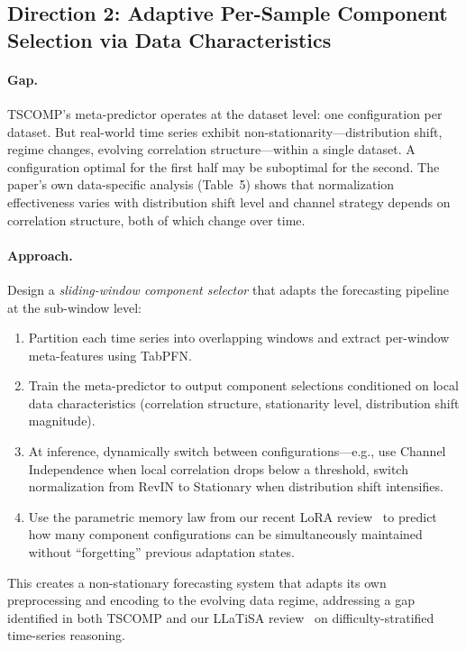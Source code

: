 \documentclass[11pt,a4paper]{article}
\begin{document}
\subsection{Direction 2: Adaptive Per-Sample Component Selection via Data Characteristics}

\paragraph{Gap.} TSCOMP's meta-predictor operates at the dataset level: one configuration per dataset. But real-world time series exhibit non-stationarity---distribution shift, regime changes, evolving correlation structure---within a single dataset. A configuration optimal for the first half may be suboptimal for the second. The paper's own data-specific analysis (Table~5) shows that normalization effectiveness varies with distribution shift level and channel strategy depends on correlation structure, both of which change over time.

\paragraph{Approach.} Design a \emph{sliding-window component selector} that adapts the forecasting pipeline at the sub-window level:
\begin{enumerate}
\item Partition each time series into overlapping windows and extract per-window meta-features using TabPFN.
\item Train the meta-predictor to output component selections conditioned on local data characteristics (correlation structure, stationarity level, distribution shift magnitude).
\item At inference, dynamically switch between configurations---e.g., use Channel Independence when local correlation drops below a threshold, switch normalization from RevIN to Stationary when distribution shift intensifies.
\item Use the parametric memory law from our recent LoRA review~\cite{xu2026lora} to predict how many component configurations can be simultaneously maintained without ``forgetting'' previous adaptation states.
\end{enumerate}
This creates a non-stationary forecasting system that adapts its own preprocessing and encoding to the evolving data regime, addressing a gap identified in both TSCOMP and our LLaTiSA review~\cite{llatisa2026} on difficulty-stratified time-series reasoning.
\end{document}
